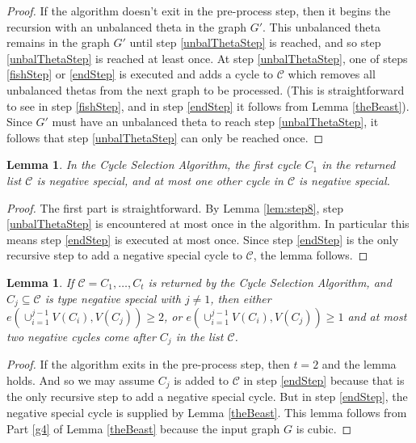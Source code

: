 \documentclass[12pt]{article}
\newtheorem{lemma}[theorem]{Lemma}
\begin{document}
\begin{proof}
    If the algorithm doesn't exit in the pre-process step, then it begins the recursion with an unbalanced theta in the graph $G'$. This unbalanced theta remains in the graph $G'$ until step \ref{unbalThetaStep} is reached, and so step \ref{unbalThetaStep} is reached at least once. At step \ref{unbalThetaStep}, one of steps \ref{fishStep} or \ref{endStep} is executed and adds a cycle to $\mathcal{C}$ which removes all unbalanced thetas from the next graph to be processed. (This is straightforward to see in step \ref{fishStep}, and in step \ref{endStep} it follows from Lemma \ref{theBeast}). Since $G'$ must have an unbalanced theta to reach step \ref{unbalThetaStep}, it follows that step \ref{unbalThetaStep} can only be reached once.
\end{proof}
    
\begin{lemma}\label{lem:special}
    In the Cycle Selection Algorithm, the first cycle $C_1$ in the returned list $\mathcal{C}$ is negative special, and at most one other cycle in $\mathcal{C}$ is negative special. 
\end{lemma}
\begin{proof}
    The first part is straightforward. By Lemma \ref{lem:step8}, step \ref{unbalThetaStep} is encountered at most once in the algorithm. In particular this means step \ref{endStep} is executed at most once. Since step \ref{endStep} is the only recursive step to add a negative special cycle to $\mathcal{C}$, the lemma follows.
\end{proof}

\begin{lemma}\label{lem:cycSelnegspec}
    If $\mathcal{C} = C_1, \dots, C_t$ is returned by the Cycle Selection Algorithm, and $C_j\subseteq \mathcal{C}$ is type negative special with $j \neq 1$, then either $e(\cup_{i = 1} ^{j-1} V(C_i), V(C_j)) \ge 2$, or $e(\cup_{i = 1} ^{j-1} V(C_i), V(C_j)) \ge 1$ and at most two negative cycles come after $C_j$ in the list $\mathcal{C}$.
\end{lemma}

\begin{proof}
    If the algorithm exits in the pre-process step, then $t=2$ and the lemma holds. And so we may assume $C_j$ is added to $\mathcal{C}$ in step \ref{endStep} because that is the only recursive step to add a negative special cycle. But in step \ref{endStep}, the negative special cycle is supplied by Lemma \ref{theBeast}. This lemma follows from Part \ref{g4} of Lemma \ref{theBeast} because the input graph $G$ is cubic.
\end{proof}
\end{document}
